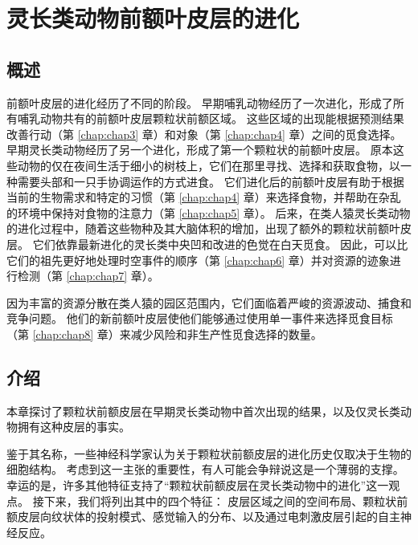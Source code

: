 \chapter{灵长类动物前额叶皮层的进化} \label{chap:chap2}

\section{概述}
前额叶皮层的进化经历了不同的阶段。
早期哺乳动物经历了一次进化，形成了所有哺乳动物共有的前额叶皮层颗粒状前额区域。
这些区域的出现能根据预测结果改善行动（第 \ref{chap:chap3} 章）和对象（第 \ref{chap:chap4} 章）之间的觅食选择。
早期灵长类动物经历了另一个进化，形成了第一个颗粒状的前额叶皮层。
原本这些动物的仅在夜间生活于细小的树枝上，它们在那里寻找、选择和获取食物，以一种需要头部和一只手协调运作的方式进食。
它们进化后的前额叶皮层有助于根据当前的生物需求和特定的习惯（第 \ref{chap:chap4} 章）来选择食物，并帮助在杂乱的环境中保持对食物的注意力（第 \ref{chap:chap5} 章）。
后来，在类人猿灵长类动物的进化过程中，随着这些物种及其大脑体积的增加，出现了额外的颗粒状前额叶皮层。
它们依靠最新进化的灵长类中央凹和改进的色觉在白天觅食。
因此，可以比它们的祖先更好地处理时空事件的顺序（第 \ref{chap:chap6} 章）并对资源的迹象进行检测（第 \ref{chap:chap7} 章）。\begin{flushright}
\end{flushright}
因为丰富的资源分散在类人猿的园区范围内，它们面临着严峻的资源波动、捕食和竞争问题。
他们的新前额叶皮层使他们能够通过使用单一事件来选择觅食目标（第 \ref{chap:chap8} 章）来减少风险和非生产性觅食选择的数量。








\section{介绍}

本章探讨了颗粒状前额皮层在早期灵长类动物中首次出现的结果，以及仅灵长类动物拥有这种皮层的事实\cite{preuss2007evolutionary}。

鉴于其名称，一些神经科学家认为关于颗粒状前额皮层的进化历史仅取决于生物的细胞结构。
考虑到这一主张的重要性，有人可能会争辩说这是一个薄弱的支撑。
幸运的是，许多其他特征支持了“颗粒状前额皮层在灵长类动物中的进化”这一观点。
接下来，我们将列出其中的四个特征：
皮层区域之间的空间布局、颗粒状前额皮层向纹状体的投射模式、感觉输入的分布、以及通过电刺激皮层引起的自主神经反应。




